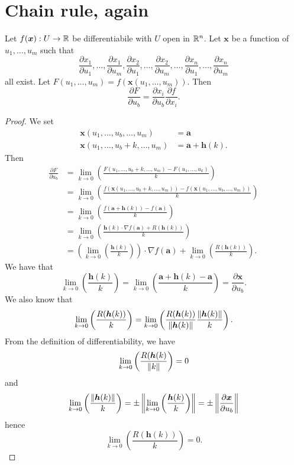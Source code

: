 \section{Chain rule, again}

\begin{theorem}
    Let $f(\bm x): U \to \mathbb{R}$ be differentiabile with $U$ open in $\mathbb{R}^n$. Let $\bm x$ be a function of $u_1, \ldots, u_m$ such that
    \[ \frac{\partial x_1}{\partial u_1}, \ldots, \frac{\partial x_1}{\partial u_m}, \frac{\partial x_2}{\partial u_1}, \ldots, \frac{\partial x_2}{\partial u_m}, \ldots, \frac{\partial x_n}{\partial u_1}, \ldots, \frac{\partial x_n}{\partial u_m} \]
    all exist. Let $F(u_1, \ldots, u_m) = f(\bm x(u_1, \ldots, u_m))$. Then
    \[ \frac{\partial F}{\partial u_b} = \frac{\partial x_i}{\partial u_b} \frac{\partial f}{\partial x_i}.  \]
\end{theorem}

\begin{proof}
    We set
    \begin{align*}
        \bm x(u_1, \ldots, u_b, \ldots, u_m)    &= \bm a             \\
        \bm x(u_1, \ldots, u_b + k, \ldots, u_m) &= \bm a + \bm h(k).
    \end{align*}
    Then
    \begin{align*}
        \frac{\partial F}{\partial u_b} &= \lim_{k \to 0} \left(\frac{F(u_1, \ldots, u_{b} + k, \ldots, u_m) - F(u_1, \ldots, u_k)}{k}\right) \\
        &= \lim_{k \to 0} \left(\frac{f(\bm x(u_1, \ldots, u_b + k, \ldots, u_m)) - f(\bm x(u_1, \ldots, u_b, \ldots, u_m))}{k}\right) \\
        &= \lim_{k \to 0} \left(\frac{f(\bm a + \bm h(k)) - f(\bm a)}{k}\right) \\
        &= \lim_{k \to 0} \left(\frac{\bm h(k) \cdot \nabla f(\bm a) + R(\bm h(k))}{k}\right) \\
        &= \left(\lim_{k \to 0}\left(\frac{\bm h(k)}{k}\right)\right) \cdot \nabla f(\bm a) + \lim_{k \to 0} \left(\frac{R(\bm h(k))}{k}\right).
    \end{align*}
    We have that
    \[ \lim_{k \to 0} \left(\frac{\bm h(k)}{k}\right) = \lim_{k \to 0} \left(\frac{\bm a + \bm h(k) - \bm a}{k}\right) = \frac{\partial \bm x}{\partial u_b}. \]
    We also know that
    \[ \lim_{k \to 0} \left(\frac{R(\bm h(k))}{k}\right) = \lim_{k \to 0} \left(\frac{R(\bm h(k))}{\left\lVert\bm h(k)\right\rVert}\frac{\left\lVert\bm h(k)\right\rVert}{k}\right). \]
    From the definition of differentiability, we have
    \[ \lim_{k \to 0} \left(\frac{R(\bm h(k)}{\left\lVert k\right\rVert}\right) = 0 \]
    and
    \[ \lim_{k \to 0} \left(\frac{\left\lVert\bm h(k)\right\rVert}{k}\right) = \pm \left\lVert\lim_{k \to 0}\left(\frac{\bm h(k)}{k}\right)\right\rVert = \pm \left\lVert\frac{\partial \bm x}{\partial u_b}\right\rVert \]
    hence
    \[ \lim_{k \to 0} \left(\frac{R(\bm h(k))}{k}\right) = 0. \]
\end{proof}

